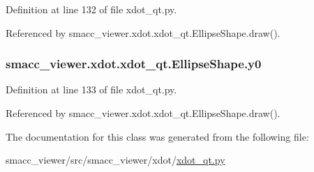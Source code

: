 Definition at line 132 of file xdot\+\_\+qt.\+py.



Referenced by smacc\+\_\+viewer.\+xdot.\+xdot\+\_\+qt.\+Ellipse\+Shape.\+draw().

\subsubsection[{\texorpdfstring{y0}{y0}}]{\setlength{\rightskip}{0pt plus 5cm}smacc\+\_\+viewer.\+xdot.\+xdot\+\_\+qt.\+Ellipse\+Shape.\+y0}\hypertarget{classsmacc__viewer_1_1xdot_1_1xdot__qt_1_1EllipseShape_a614b6db830bef05d87ca2dd403401e11}{}\label{classsmacc__viewer_1_1xdot_1_1xdot__qt_1_1EllipseShape_a614b6db830bef05d87ca2dd403401e11}


Definition at line 133 of file xdot\+\_\+qt.\+py.



Referenced by smacc\+\_\+viewer.\+xdot.\+xdot\+\_\+qt.\+Ellipse\+Shape.\+draw().



The documentation for this class was generated from the following file\+:\begin{DoxyCompactItemize}
\item 
smacc\+\_\+viewer/src/smacc\+\_\+viewer/xdot/\hyperlink{xdot__qt_8py}{xdot\+\_\+qt.\+py}\end{DoxyCompactItemize}
